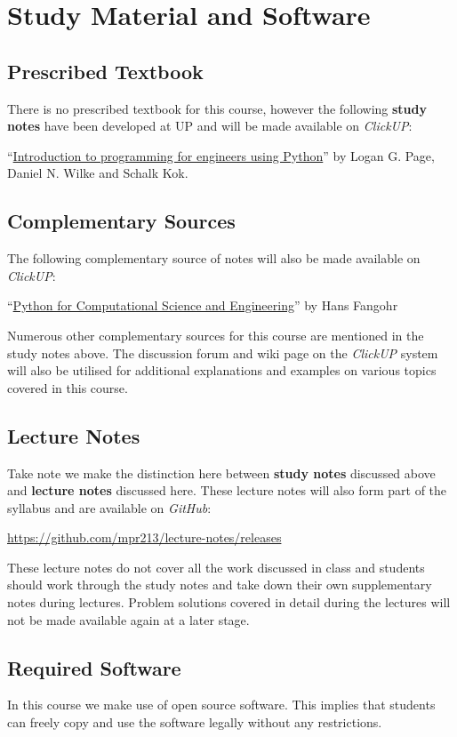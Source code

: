 \section{Study Material and Software}
    \subsection{Prescribed Textbook}
        There is no prescribed textbook for this course, however the following
        \textbf{study notes} have been developed at UP and will be made
        available on {\it ClickUP}:

        ``\underline{Introduction to programming for engineers using Python}''
        by Logan G. Page, Daniel N. Wilke and Schalk Kok.

    \subsection{Complementary Sources}
        The following complementary source of notes will also be made available
        on {\it ClickUP}:

        ``\underline{Python for Computational Science and Engineering}'' by
        Hans Fangohr

        Numerous other complementary sources for this course are mentioned in
        the study notes above. The discussion forum and wiki page on the {\it
        ClickUP} system will also be utilised for additional explanations and
        examples on various topics covered in this course.

    \subsection{Lecture Notes}
        Take note we make the distinction here between \textbf{study notes}
        discussed above and \textbf{lecture notes} discussed here. These
        lecture notes will also form part of the syllabus and are available on
        \textit{GitHub}:

        \url{https://github.com/mpr213/lecture-notes/releases}

        These lecture notes do not cover all the work discussed in class and
        students should work through the study notes and take down their own
        supplementary notes during lectures. Problem solutions covered in
        detail during the lectures will not be made available again at a later
        stage.

    \subsection{Required Software}
        In this course we make use of open source software. This implies
        that students can freely copy and use the software legally
        without any restrictions.

